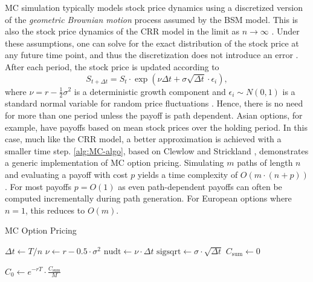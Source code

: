 \documentclass[english,12pt,a4paper,pdftex,sci,utf8]{aaltothesis}
\begin{document}
MC simulation typically models stock price dynamics using a discretized version of the \emph{geometric Brownian motion} process assumed by the BSM model. This is also the stock price dynamics of the CRR model in the limit as $n \rightarrow \infty$ \cite{cox1979option}. Under these assumptions, one can solve for the exact distribution of the stock price at any future time point, and thus the discretization does not introduce an error \cite{clewlow1998implementing}. After each period, the stock price is updated according to
\begin{equation*}
S_{t+\Delta t} = S_t \cdot \exp \left( \nu \Delta t + \sigma \sqrt{\Delta t} \cdot \epsilon_i \right),
\label{eq:GBM-price}
\end{equation*}
where $\nu=r-\frac{1}{2}\sigma^2$ is a deterministic growth component and $\epsilon_i \sim N(0,1)$ is a standard normal variable for random price fluctuations \cite{clewlow1998implementing}. Hence, there is no need for more than one period unless the payoff is path dependent. Asian options, for example, have payoffs based on mean stock prices over the holding period. In this case, much like the CRR model, a better approximation is achieved with a smaller time step. \cref{alg:MC-algo}, based on Clewlow and Strickland \cite{clewlow1998implementing}, demonstrates a generic implementation of MC option pricing. Simulating $m$ paths of length $n$ and evaluating a payoff with cost $p$ yields a time complexity of $O(m \cdot (n+p))$. For most payoffs $p=O(1)$ as even path-dependent payoffs can often be computed incrementally during path generation. For European options where $n=1$, this reduces to $O(m)$.

\begin{algorithm}
\LinesNumbered
\caption{MC Option Pricing}
\label{alg:MC-algo}

$\Delta t \gets T/n$\;
$\nu \gets r - 0.5 \cdot \sigma^2$\;
$\text{nudt} \gets \nu \cdot \Delta t$\;
$\text{sigsqrt} \gets \sigma \cdot \sqrt{\Delta t}$\;
$C_{\text{sum}} \gets 0$\;

\BlankLine
{}

\BlankLine
{}
$C_0 \gets e^{-rT} \cdot \frac{C_{\text{sum}}}{M}$\;

\;
\end{algorithm}
\end{document}
